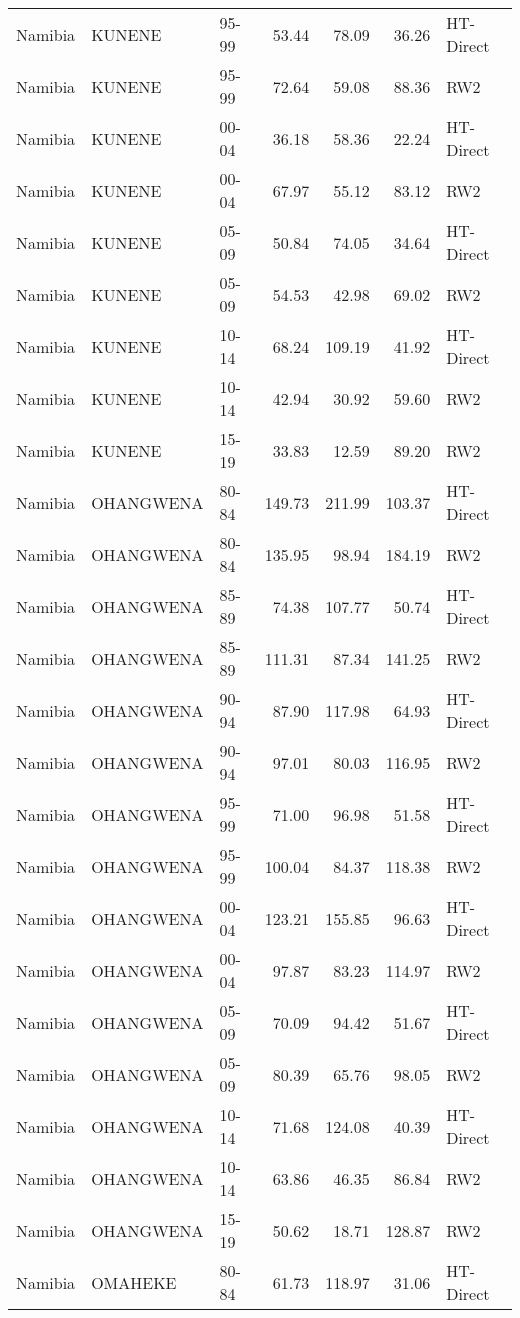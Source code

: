 \begin{longtable}{lllrrrl}
  Namibia & KUNENE & 95-99 & 53.44 & 78.09 & 36.26 & HT-Direct \\ 
  Namibia & KUNENE & 95-99 & 72.64 & 59.08 & 88.36 & RW2 \\ 
  Namibia & KUNENE & 00-04 & 36.18 & 58.36 & 22.24 & HT-Direct \\ 
  Namibia & KUNENE & 00-04 & 67.97 & 55.12 & 83.12 & RW2 \\ 
  Namibia & KUNENE & 05-09 & 50.84 & 74.05 & 34.64 & HT-Direct \\ 
  Namibia & KUNENE & 05-09 & 54.53 & 42.98 & 69.02 & RW2 \\ 
  Namibia & KUNENE & 10-14 & 68.24 & 109.19 & 41.92 & HT-Direct \\ 
  Namibia & KUNENE & 10-14 & 42.94 & 30.92 & 59.60 & RW2 \\ 
  Namibia & KUNENE & 15-19 & 33.83 & 12.59 & 89.20 & RW2 \\ 
  Namibia & OHANGWENA & 80-84 & 149.73 & 211.99 & 103.37 & HT-Direct \\ 
  Namibia & OHANGWENA & 80-84 & 135.95 & 98.94 & 184.19 & RW2 \\ 
  Namibia & OHANGWENA & 85-89 & 74.38 & 107.77 & 50.74 & HT-Direct \\ 
  Namibia & OHANGWENA & 85-89 & 111.31 & 87.34 & 141.25 & RW2 \\ 
  Namibia & OHANGWENA & 90-94 & 87.90 & 117.98 & 64.93 & HT-Direct \\ 
  Namibia & OHANGWENA & 90-94 & 97.01 & 80.03 & 116.95 & RW2 \\ 
  Namibia & OHANGWENA & 95-99 & 71.00 & 96.98 & 51.58 & HT-Direct \\ 
  Namibia & OHANGWENA & 95-99 & 100.04 & 84.37 & 118.38 & RW2 \\ 
  Namibia & OHANGWENA & 00-04 & 123.21 & 155.85 & 96.63 & HT-Direct \\ 
  Namibia & OHANGWENA & 00-04 & 97.87 & 83.23 & 114.97 & RW2 \\ 
  Namibia & OHANGWENA & 05-09 & 70.09 & 94.42 & 51.67 & HT-Direct \\ 
  Namibia & OHANGWENA & 05-09 & 80.39 & 65.76 & 98.05 & RW2 \\ 
  Namibia & OHANGWENA & 10-14 & 71.68 & 124.08 & 40.39 & HT-Direct \\ 
  Namibia & OHANGWENA & 10-14 & 63.86 & 46.35 & 86.84 & RW2 \\ 
  Namibia & OHANGWENA & 15-19 & 50.62 & 18.71 & 128.87 & RW2 \\ 
  Namibia & OMAHEKE & 80-84 & 61.73 & 118.97 & 31.06 & HT-Direct \\ 

\end{longtable}

